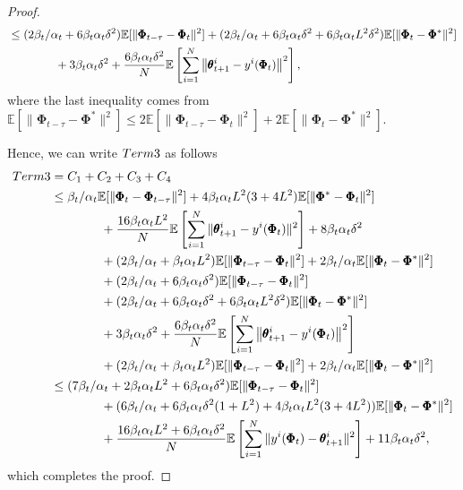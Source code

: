 \documentclass{article} %
\theoremstyle{plain}
\theoremstyle{definition}
\theoremstyle{remark}
\begin{document}
{\begin{proof}
\begin{align*}
    &\leq (2\beta_t/\alpha_t+6\beta_t\alpha_t\delta^2)\mathbb{E}[\|\pmb{\Phi}_{t-\tau}-\pmb{\Phi}_t\|^2]+(2\beta_t/\alpha_t+6\beta_t\alpha_t\delta^2+6\beta_t\alpha_tL^2\delta^2)\mathbb{E}[\|\pmb{\Phi}_t-\pmb{\Phi}^*\|^2]\allowdisplaybreaks\\
    &\qquad\qquad+3\beta_t\alpha_t\delta^2+\frac{6\beta_t\alpha_t\delta^2}{N}\mathbb{E}\left[\sum_{i=1}^N\left\|\pmb{\theta}_{t+1}^i-y^i(\pmb{\Phi}_t)\right\|^2\right],
\end{align*}
where the last inequality comes from $\mathbb{E}[\|\pmb{\Phi}_{t-\tau}-\pmb{\Phi}^*\|^2]\leq 2\mathbb{E}[\|\pmb{\Phi}_{t-\tau}-\pmb{\Phi}_t\|^2]+2\mathbb{E}[\|\pmb{\Phi}_{t}-\pmb{\Phi}^*\|^2]$.

Hence, we can write $\textnormal{Term 3}$ as follows
\begin{align*}
    \textnormal{Term 3} &= C_1+C_2+C_3+C_4\allowdisplaybreaks\\
    &\leq \beta_t/\alpha_t\mathbb{E}[\|\pmb{\Phi}_t-\pmb{\Phi}_{t-\tau}\|^2] +4\beta_t \alpha_tL^2 (3+4L^2)\mathbb{E}[\|\pmb{\Phi}^*-\pmb{\Phi}_t\|^2]\nonumber\allowdisplaybreaks\\
    &\qquad\qquad+\frac{16\beta_t
     \alpha_t L^2}{N}\mathbb{E}\left[\sum_{i=1}^N\|\pmb{\theta}_{t+1}^i-y^i(\pmb{\Phi}_t)\|^2\right]+8\beta_t\alpha_t\delta^2\allowdisplaybreaks\\
    &\qquad\qquad+(2\beta_t/\alpha_t+\beta_t\alpha_t L^2)\mathbb{E}[\|\pmb{\Phi}_{t-\tau}-\pmb{\Phi}_t\|^2]+2\beta_t/\alpha_t\mathbb{E}[\|\pmb{\Phi}_t-\pmb{\Phi}^*\|^2]\allowdisplaybreaks\\
    &\qquad\qquad+(2\beta_t/\alpha_t+6\beta_t\alpha_t\delta^2)\mathbb{E}[\|\pmb{\Phi}_{t-\tau}-\pmb{\Phi}_t\|^2]\allowdisplaybreaks\\
    &\qquad\qquad+(2\beta_t/\alpha_t+6\beta_t\alpha_t\delta^2+6\beta_t\alpha_tL^2\delta^2)\mathbb{E}[\|\pmb{\Phi}_t-\pmb{\Phi}^*\|^2]\allowdisplaybreaks\\
    &\qquad\qquad+3\beta_t\alpha_t\delta^2+\frac{6\beta_t\alpha_t\delta^2}{N}\mathbb{E}\left[\sum_{i=1}^N\left\|\pmb{\theta}_{t+1}^i-y^i(\pmb{\Phi}_t)\right\|^2\right]\allowdisplaybreaks\\
    &\qquad\qquad+(2\beta_t/\alpha_t+\beta_t\alpha_t L^2)\mathbb{E}[\|\pmb{\Phi}_{t-\tau}-\pmb{\Phi}_t\|^2]+2\beta_t/\alpha_t\mathbb{E}[\|\pmb{\Phi}_t-\pmb{\Phi}^*\|^2]\allowdisplaybreaks\\
    &\leq (7\beta_t/\alpha_t+2\beta_t\alpha_t L^2+6\beta_t\alpha_t\delta^2)\mathbb{E}[\|\pmb{\Phi}_{t-\tau}-\pmb{\Phi}_t\|^2]\allowdisplaybreaks\\
    &\qquad\qquad+(6\beta_t/\alpha_t+6\beta_t\alpha_t\delta^2(1+L^2) +4\beta_t\alpha_tL^2(3+4L^2))\mathbb{E}[\|\pmb{\Phi}_t-\pmb{\Phi}^*\|^2]\allowdisplaybreaks\\
    &\qquad\qquad+\frac{16\beta_t \alpha_t L^2+6\beta_t\alpha_t\delta^2}{N}\mathbb{E}\left[\sum_{i=1}^N\|y^i(\pmb{\Phi}_t)-\pmb{\theta}^i_{t+1}\|^2\right]+11\beta_t\alpha_t\delta^2,
\end{align*}
which completes the proof.
\end{proof}

}
\end{document}
